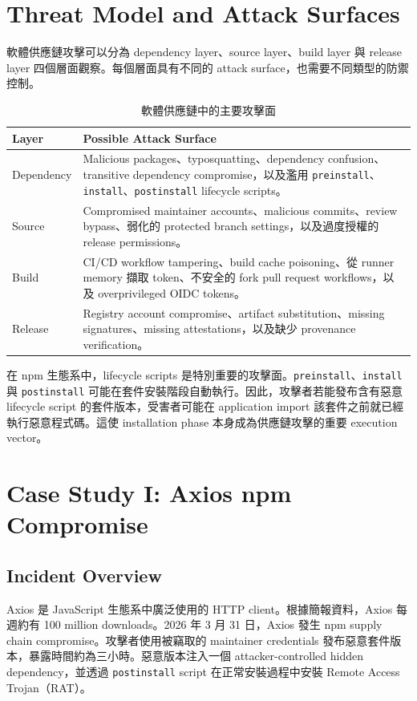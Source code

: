 \documentclass[12pt,a4paper]{article}
\begin{document}
\section{Threat Model and Attack Surfaces}

軟體供應鏈攻擊可以分為 dependency layer、source layer、build layer 與 release layer 四個層面觀察。每個層面具有不同的 attack surface，也需要不同類型的防禦控制。

\begin{table}[h]
\centering
\caption{軟體供應鏈中的主要攻擊面}
\begin{tabularx}{\textwidth}{P{3cm}Y}
\toprule
\textbf{Layer} & \textbf{Possible Attack Surface} \\
\midrule
Dependency & Malicious packages、typosquatting、dependency confusion、transitive dependency compromise，以及濫用 \texttt{preinstall}、\texttt{install}、\texttt{postinstall} lifecycle scripts。 \\
Source & Compromised maintainer accounts、malicious commits、review bypass、弱化的 protected branch settings，以及過度授權的 release permissions。 \\
Build & CI/CD workflow tampering、build cache poisoning、從 runner memory 擷取 token、不安全的 fork pull request workflows，以及 overprivileged OIDC tokens。 \\
Release & Registry account compromise、artifact substitution、missing signatures、missing attestations，以及缺少 provenance verification。 \\
\bottomrule
\end{tabularx}
\end{table}

在 npm 生態系中，lifecycle scripts 是特別重要的攻擊面。\texttt{preinstall}、\texttt{install} 與 \texttt{postinstall} 可能在套件安裝階段自動執行。因此，攻擊者若能發布含有惡意 lifecycle script 的套件版本，受害者可能在 application import 該套件之前就已經執行惡意程式碼。這使 installation phase 本身成為供應鏈攻擊的重要 execution vector。

\section{Case Study I: Axios npm Compromise}

\subsection{Incident Overview}

Axios 是 JavaScript 生態系中廣泛使用的 HTTP client。根據簡報資料，Axios 每週約有 100 million downloads。2026 年 3 月 31 日，Axios 發生 npm supply chain compromise。攻擊者使用被竊取的 maintainer credentials 發布惡意套件版本，暴露時間約為三小時。惡意版本注入一個 attacker-controlled hidden dependency，並透過 \texttt{postinstall} script 在正常安裝過程中安裝 Remote Access Trojan（RAT）。
\end{document}
